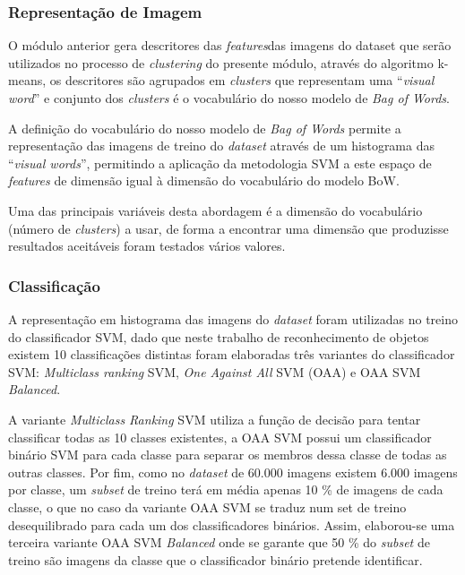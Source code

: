 \documentclass[extendedabs]{vcom}
\begin{document}
\subsubsection{Representação de Imagem}
O módulo anterior gera descritores das \textit{features}das imagens do dataset que serão utilizados no processo de \textit{clustering} do presente módulo, através do algoritmo k-means, os descritores são agrupados em \textit{clusters} que representam uma “\textit{visual word}” e conjunto dos \textit{clusters} é o vocabulário do nosso modelo de \textit{Bag of Words}.

A definição do vocabulário do nosso modelo de \textit{Bag of Words} permite a representação das imagens de treino do \textit{dataset} através de um histograma das “\textit{visual words}”, permitindo a aplicação da metodologia SVM a este espaço de \textit{features} de dimensão igual à dimensão do vocabulário do modelo BoW.

Uma das principais variáveis desta abordagem é a dimensão do vocabulário (número de \textit{clusters}) a usar, de forma a encontrar uma dimensão que produzisse resultados aceitáveis foram testados vários valores. 

\subsubsection{Classificação}
A representação em histograma das imagens do \textit{dataset} foram utilizadas no treino do classificador SVM, dado que neste trabalho de reconhecimento de objetos existem 10 classificações distintas foram elaboradas três variantes do classificador SVM: \textit{Multiclass ranking} SVM, \textit{One Against All} SVM (OAA) e OAA SVM \textit{Balanced}. 

A variante \textit{Multiclass Ranking} SVM utiliza a função de decisão para tentar classificar todas as 10 classes existentes, a OAA SVM possui um classificador binário SVM para cada classe para separar os membros dessa classe de todas as outras classes. Por fim, como no \textit{dataset} de 60.000 imagens existem 6.000 imagens por classe, um \textit{subset} de treino terá em média apenas 10 \% de imagens de cada classe, o que no caso da variante OAA SVM se traduz num set de treino desequilibrado para cada um dos classificadores binários. Assim, elaborou-se uma terceira variante OAA SVM \textit{Balanced} onde se garante que 50 \% do \textit{subset} de treino são imagens da classe que o classificador binário pretende identificar.
\end{document}
